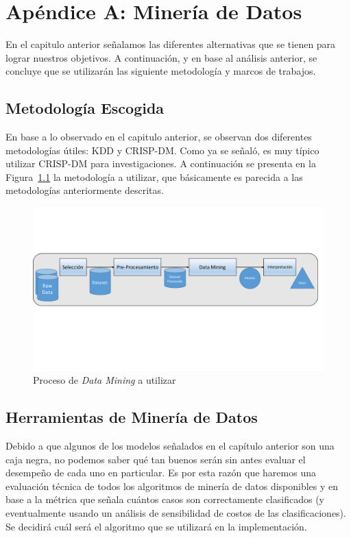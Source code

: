 \chapter{Apéndice A: Minería de Datos}
En el capitulo anterior señalamos las diferentes alternativas que se tienen para lograr nuestros objetivos. A continuación, y en base al análisis anterior, se concluye que se utilizarán las siguiente metodología y marcos de trabajos.
\section{Metodología Escogida}
En base a lo observado en el capitulo anterior, se observan dos diferentes metodologías útiles: KDD y CRISP-DM. Como ya se señaló, es muy típico utilizar CRISP-DM para investigaciones.
A continuación se presenta en la Figura~\ref{fig:met} la metodología a utilizar, que básicamente es parecida a las metodologías anteriormente descritas.
\begin{figure}[H]
  \centering
    \includegraphics[width=1\textwidth]{Figuras/Metodologia}
      \caption{Proceso de \textit{Data Mining} a utilizar}
    \label{fig:met}
\end{figure}
\section{Herramientas de Minería de Datos}
Debido a que algunos de los modelos señalados en el capítulo anterior son una caja negra, no podemos saber qué tan buenos serán sin antes evaluar el desempeño de cada uno en particular. Es por esta razón que haremos una evaluación técnica de todos los algoritmos de minería de datos disponibles y en base a la métrica que señala cuántos casos son correctamente clasificados (y eventualmente usando un análisis de sensibilidad de costos de las clasificaciones). Se decidirá cuál será el algoritmo que se utilizará en la implementación.
